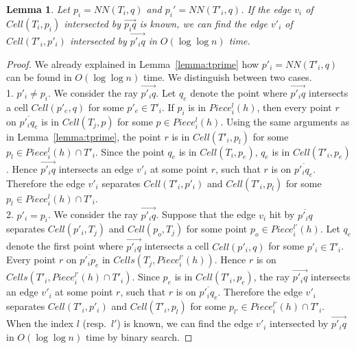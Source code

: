 \documentclass[12pt,a4paper,USenglish,cleveref, autoref, thm-restate]{article}
\newcommand{\ov}[1]{\overline{#1}}
\newcommand{\ovar}[1]{\overrightarrow{#1}}
\newcommand{\Cell}{\mathit{Cell}}
\newcommand{\Cells}{\mathit{Cells}}
\newcommand{\NN}{\mathit{NN}}
\newtheorem{lemma}{Lemma}
\newcommand{\ov}[1]{\overline{#1}}
\newcommand{\ovar}[1]{\overrightarrow{#1}}
\newcommand{\Cell}{\mathit{Cell}}
\newcommand{\Cells}{\mathit{Cells}}
\newcommand{\NN}{\mathit{NN}}
\newcommand{\ov}[1]{\overline{#1}}
\newcommand{\ovar}[1]{\overrightarrow{#1}}
\newcommand{\Cell}{\mathit{Cell}}
\newcommand{\Cells}{\mathit{Cells}}
\newcommand{\NN}{\mathit{NN}}
\begin{document}
\begin{lemma}
  \label{lemma:tprime2}
  Let $p_i=\NN(T_i,q)$ and $p_i'=\NN(T'_i,q)$. 
  If  the edge $v_i$ of $\Cell(T_i,p_i)$ intersected by $\ovar{p_iq}$ is known, we can find the edge $v'_i$ of $\Cell(T'_i,p'_i)$ intersected by $\ovar{p'_iq}$ in $O(\log \log n)$ time.  
\end{lemma}
\begin{proof}
  We already explained in Lemma~\ref{lemma:tprime} how $p'_i=\NN(T'_i,q)$ can be found in $O(\log\log n)$ time. We distinguish between two cases.\\
  1. $p'_i\not= p_i$.  We consider the ray $\ovar{p'_iq}$. Let $q_e$ denote the point where $\ovar{p'_iq}$ intersects  a cell $\Cell(p'_e,q)$ for some $p'_e\in T'_i$. If  $p_i$ is in $Piece^l_i(h)$, then every point $r$ on $\ov{p'_iq_e}$ is in $\Cell(T_j,p)$ for some $p\in Piece^l_i(h)$. Using the same arguments as in Lemma~\ref{lemma:tprime}, the point $r$ is in $\Cell(T'_i,p_l)$ for some $p_l\in Piece^l_i(h)\cap T'_i$.  Since the point $q_e$ is in $\Cell(T_i,p_e)$, $q_e$ is in $\Cell(T'_i,p_e)$. Hence $\ovar{p'_iq}$ intersects an edge $v'_i$ at some point $r$, such that $r$ is on $\ov{p'_iq_e}$. Therefore the edge $v'_i$ separates $\Cell(T'_i,p'_i)$ and $\Cell(T'_i,p_l)$ for some $p_l\in Piece^l_i(h)\cap T'_i$.\\
  2. $p'_i=p_i$.  We consider  the ray $\ovar{p'_iq}$. Suppose that the edge $v_i$ hit by $\ov{p'_iq}$ separates $\Cell(p'_i,T_j)$ and $\Cell(p_o,T_j)$ for some point $p_o\in Piece^{l'}_i(h)$. Let $q_e$ denote the first point where $\ovar{p'_iq}$ intersects  a cell $\Cell(p'_i,q)$ for some $p'_i\in T'_i$. Every  point $r$  on $\ov{p'_ip_e}$ in $\Cells(T_j,Piece^{l'}_i(h))$. Hence $r$ is on  $\Cells(T'_i,Piece^{l'}_i(h)\cap T'_i)$. Since $p_e$ is in $\Cell(T'_i,p_e)$, the ray  $\ovar{p'_iq}$ intersects an edge $v'_i$ at some point $r$, such that $r$ is on $\ov{p'_iq_e}$. Therefore the edge $v'_i$ separates $\Cell(T'_i,p'_i)$ and $\Cell(T'_i,p_l)$ for some $p_{l'}\in Piece^{l'}_i(h)\cap T'_i$.\\
  When the index $l$ (resp.\ $l'$) is known, we can find the edge $v'_i$ intersected by $\ovar{p'_iq}$ in $O(\log\log n)$ time by binary search. 
\end{proof}
\end{document}
